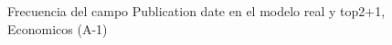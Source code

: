 \begin{figure}[H]
    \centering
    
    \caption{Frecuencia del campo Publication date en el modelo real y top2+1, Economicos (A-1)}
    \label{frecuency-Publication Date-top2+1}
\end{figure}